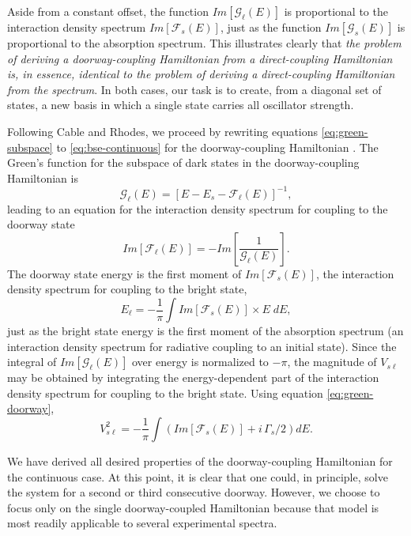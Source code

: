 Aside from a constant offset, the function $Im[\mathcal{G}_{\ell}(E)]$
is proportional to the interaction density spectrum
$Im[\mathcal{F}_s(E)]$, just as the function $Im[\mathcal{G}_s(E)]$ is
proportional to the absorption spectrum.  This illustrates clearly
that \emph{the problem of deriving a doorway-coupling Hamiltonian from
  a direct-coupling Hamiltonian is, in essence, identical to the
  problem of deriving a direct-coupling Hamiltonian from the
  spectrum}.  In both cases, our task is to create, from a diagonal
set of states, a new basis in which a single state carries all
oscillator strength.

Following Cable and Rhodes, we proceed by rewriting equations
\ref{eq:green-subspace} to \ref{eq:bse-continuous} for the
doorway-coupling Hamiltonian \cite{cable80}.  The Green's function for
the subspace of dark states in the doorway-coupling Hamiltonian is
\begin{equation}
  \label{eq:green-doorway-subspace}
  \mathcal{G}_{\ell}(E) = [E - E_s - \mathcal{F}_{\ell}(E)]^{-1},
\end{equation}
leading to an equation for the interaction density spectrum for
coupling to the doorway state
\begin{equation}
  \label{eq:idf}
  Im[\mathcal{F}_{\ell}(E)] = - Im \left [
    \frac{1}{\mathcal{G}_{\ell}(E)}
  \right ].
\end{equation}
The doorway state energy is the first moment of
$Im[\mathcal{F}_{s}(E)]$, the interaction density spectrum for
coupling to the bright state,
\begin{equation}
  \label{eq:dse-continuous}
  E_{\ell} = - \frac{1}{\pi} \int Im[\mathcal{F}_s(E)] \times E \; dE,
\end{equation}
just as the bright state energy is the first moment of the absorption
spectrum (an interaction density spectrum for radiative coupling to an
initial state).  Since the integral of $Im[\mathcal{G}_{\ell}(E)]$
over energy is normalized to $-\pi$, the magnitude of $V_{s\ell}$ may
be obtained by integrating the energy-dependent part of the interaction
density spectrum for coupling to the bright state.  Using equation
\ref{eq:green-doorway},
\begin{equation}
  V_{s\ell}^2 = -\frac{1}{\pi} \int \left (
    Im[\mathcal{F}_s(E)] + i \, \Gamma_s / 2
  \right ) dE.
\end{equation}

We have derived all desired properties of the doorway-coupling
Hamiltonian for the continuous case.  At this point, it is clear that
one could, in principle, solve the system for a second or third
consecutive doorway.  However, we choose to focus only on the single
doorway-coupled Hamiltonian because that model is most readily
applicable to several experimental spectra.

